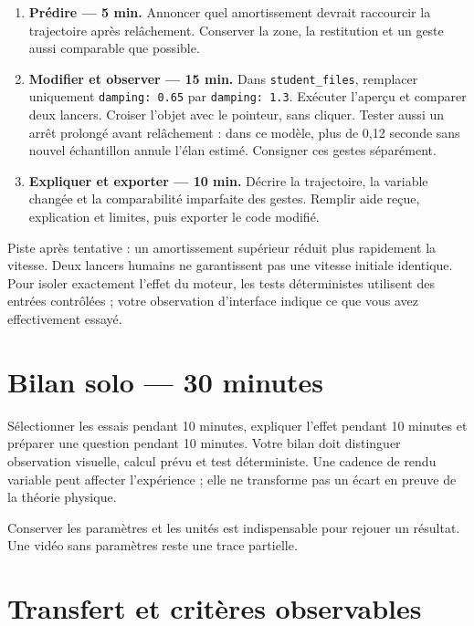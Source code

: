 \documentclass[
  canadien,
  11pt,
  a4paper,
]{report}
\providecommand{\tightlist}{%
  \setlength{\itemsep}{0pt}\setlength{\parskip}{0pt}}
\begin{document}
\begin{enumerate}
\def\labelenumi{\arabic{enumi}.}
\tightlist
\item
  \textbf{Prédire --- 5 min.} Annoncer quel amortissement devrait
  raccourcir la trajectoire après relâchement. Conserver la zone, la
  restitution et un geste aussi comparable que possible.
\item
  \textbf{Modifier et observer --- 15 min.} Dans
  \texttt{student\_\allowbreak{}files}, remplacer uniquement \texttt{damping:\ 0.65}
  par \texttt{damping:\ 1.3}. Exécuter l'aperçu et comparer deux
  lancers. Croiser l'objet avec le pointeur, sans cliquer. Tester aussi
  un arrêt prolongé avant relâchement : dans ce modèle, plus de 0,12
  seconde sans nouvel échantillon annule l'élan estimé. Consigner ces
  gestes séparément.
\item
  \textbf{Expliquer et exporter --- 10 min.} Décrire la trajectoire, la
  variable changée et la comparabilité imparfaite des gestes. Remplir
  aide reçue, explication et limites, puis exporter le code modifié.
\end{enumerate}

Piste après tentative : un amortissement supérieur réduit plus
rapidement la vitesse. Deux lancers humains ne garantissent pas une
vitesse initiale identique. Pour isoler exactement l'effet du moteur,
les tests déterministes utilisent des entrées contrôlées ; votre
observation d'interface indique ce que vous avez effectivement essayé.

\section{Bilan solo --- 30 minutes}\label{bilan-solo-30-minutes-3}

Sélectionner les essais pendant 10 minutes, expliquer l'effet pendant 10
minutes et préparer une question pendant 10 minutes. Votre bilan doit
distinguer observation visuelle, calcul prévu et test déterministe. Une
cadence de rendu variable peut affecter l'expérience ; elle ne
transforme pas un écart en preuve de la théorie physique.

Conserver les paramètres et les unités est indispensable pour rejouer un
résultat. Une vidéo sans paramètres reste une trace partielle.

\section{Transfert et critères
observables}\label{transfert-et-crituxe8res-observables-3}
\end{document}
